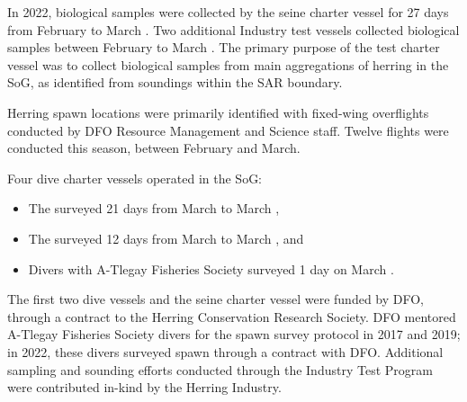 In 2022, biological samples were collected by the seine charter vessel
 for 27 days from February  to March .
Two additional Industry test vessels collected biological samples
between February  to March .
The primary purpose of the test charter vessel was to
collect biological samples from main aggregations of herring in the SoG,
as identified from soundings within the SAR boundary.

Herring spawn locations were primarily identified with fixed-wing overflights
conducted by DFO Resource Management and Science staff.
Twelve flights were conducted this season, between February and March.

Four dive charter vessels operated in the SoG:

\begin{itemize}

\item The  surveyed 21 days from March  to March ,

\item The  surveyed 12 days from March  to March , and

\item Divers with A-Tlegay Fisheries Society surveyed 1 day on March .

\end{itemize}

The first two dive vessels and the seine charter vessel  were funded by DFO,
through a contract to the Herring Conservation Research Society.
DFO mentored A-Tlegay Fisheries Society divers for the spawn survey protocol in 2017 and 2019;
in 2022, these divers surveyed spawn through a contract with DFO.
Additional sampling and sounding efforts conducted through the
Industry Test Program were contributed in-kind by the Herring Industry.
